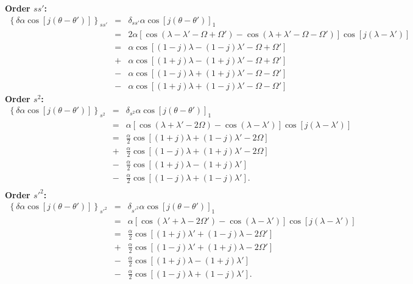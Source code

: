 \documentclass [12pt, a4paper] {article}
\begin{document}
\newpage
\textbf{Order $ss'$:}
\begin {eqnarray}
    \left\{\delta\alpha\cos[j(\theta - \theta')]\right\}_{ss'}
    &=&
    \delta_{ss'}\alpha\cos[j(\theta - \theta')]_1
    \\
    &=&
    2\alpha\left[
        \cos(\lambda - \lambda' - \Omega + \Omega') 
        -
        \cos(\lambda + \lambda' - \Omega - \Omega')
    \right]
    \cos[j(\lambda - \lambda')]
    \\
    &=&
    \alpha\cos[(1-j)\lambda - (1-j)\lambda' - \Omega + \Omega']
    \\\nonumber
    &+&
    \alpha\cos[(1+j)\lambda - (1+j)\lambda' - \Omega + \Omega']
    \\\nonumber
    &-&
    \alpha\cos[(1-j)\lambda + (1+j)\lambda' - \Omega - \Omega']
    \\\nonumber
    &-&
    \alpha\cos[(1+j)\lambda + (1-j)\lambda' - \Omega - \Omega']
\end {eqnarray}
\textbf{Order $s^2$:}
\begin {eqnarray}
    \left\{\delta\alpha\cos[j(\theta - \theta')]\right\}_{s^2}
    &=&
    \delta_{s^2}\alpha\cos[j(\theta - \theta')]_1
    \\
    &=&
    \alpha[\cos(\lambda + \lambda' - 2\Omega) - \cos(\lambda - \lambda')]
    \cos[j(\lambda - \lambda')]
    \\
    &=&
    \frac{\alpha}{2}\cos[(1+j)\lambda + (1-j)\lambda' - 2\Omega] 
    \\\nonumber 
    &+&
    \frac{\alpha}{2}\cos[(1-j)\lambda + (1+j)\lambda' - 2\Omega] 
    \\\nonumber 
    &-&
    \frac{\alpha}{2}\cos[(1+j)\lambda - (1+j)\lambda'] 
    \\\nonumber 
    &-&
    \frac{\alpha}{2}\cos[(1-j)\lambda + (1-j)\lambda']. 
    \\\nonumber 
\end {eqnarray}
\textbf{Order $s'^2$:}
\begin {eqnarray}
    \left\{\delta\alpha\cos[j(\theta - \theta')]\right\}_{s'^2}
    &=&
    \delta_{s'^2}\alpha\cos[j(\theta - \theta')]_1
    \\
    &=&
    \alpha[\cos(\lambda' + \lambda - 2\Omega') - \cos(\lambda - \lambda')]
    \cos[j(\lambda - \lambda')]
    \\
    &=&
    \frac{\alpha}{2}\cos[(1+j)\lambda' + (1-j)\lambda - 2\Omega'] 
    \\\nonumber 
    &+&
    \frac{\alpha}{2}\cos[(1-j)\lambda' + (1+j)\lambda - 2\Omega'] 
    \\\nonumber 
    &-&
    \frac{\alpha}{2}\cos[(1+j)\lambda - (1+j)\lambda'] 
    \\\nonumber 
    &-&
    \frac{\alpha}{2}\cos[(1-j)\lambda + (1-j)\lambda']. 
    \\\nonumber 
\end {eqnarray}
\end{document}
